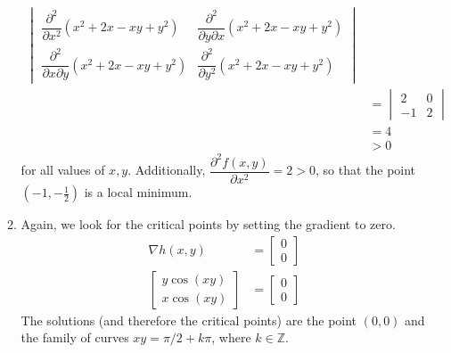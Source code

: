 \documentclass{article}
\begin{document}
\begin{enumerate}
\begin{enumerate}
\begin{align*}
\begin{vmatrix}
     \dfrac{\partial^2}{\partial x^2}(x^2 + 2x - xy + y^2) &
      \dfrac{\partial^2}{\partial y \partial x}(x^2 + 2x - xy + y^2) \\
     \dfrac{\partial^2}{\partial x \partial y}(x^2 + 2x - xy + y^2) &
      \dfrac{\partial^2}{\partial y^2}(x^2 + 2x - xy + y^2)
    \end{vmatrix} \\
    &= \begin{vmatrix} 2 & 0 \\ -1 & 2 \end{vmatrix} \\
    &= 4 \\
    &> 0
   \end{align*}
  for all values of $x,y$.
  Additionally, $\dfrac{\partial^2 f(x,y)}{\partial x^2} = 2 > 0$, so that
  the point $(-1, -\frac{1}{2})$ is a local minimum.

  \item Again, we look for the critical points by setting the gradient to zero.
   \begin{align*}
    \nabla h(x,y) &= \begin{bmatrix} 0 \\ 0 \end{bmatrix} \\
    \begin{bmatrix} y\cos(xy) \\ x\cos(xy) \end{bmatrix}
    &= \begin{bmatrix} 0 \\ 0 \end{bmatrix}
   \end{align*}
  The solutions (and therefore the critical points) are the point $(0, 0)$
  and the family of curves $xy = \pi/2 + k\pi$, where $k \in \mathbb{Z}$.


\end{enumerate}
\end{enumerate}
\end{document}

